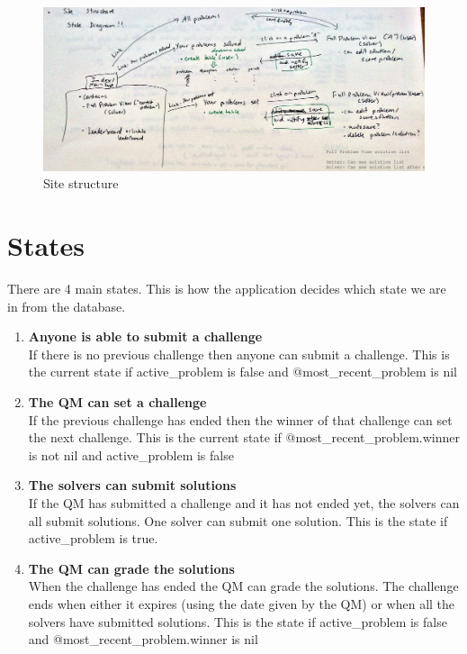 \documentclass{report}
\begin{document}
\begin{figure}[H]
\includegraphics[width=\textwidth]{structure}
\caption{Site structure}
\end{figure}

\section{States}
There are 4 main states. This is how the application decides which state we are in from the database.

\begin{enumerate}
	\item \textbf{Anyone is able to submit a challenge}\hfill\\
	If there is no previous challenge then anyone can submit a challenge. This is the current state if active\_problem is false and @most\_recent\_problem is nil \\
	\item \textbf{The QM can set a challenge}\hfill\\
	If the previous challenge has ended then the winner of that challenge can set the next challenge. This is the current state if @most\_recent\_problem.winner is not nil and active\_problem is false\\
	\item \textbf{The solvers can submit solutions}\hfill\\
	If the QM has submitted a challenge and it has not ended yet, the solvers can all submit solutions. One solver can submit one solution. This is the state if active\_problem is true.\\
	\item \textbf{The QM can grade the solutions}\hfill\\
	When the challenge has ended the QM can grade the solutions. The challenge ends when either it expires (using the date given by the QM) or when all the solvers have submitted solutions. This is the state if active\_problem is false and @most\_recent\_problem.winner is nil\\
\end{enumerate}
\end{document}
